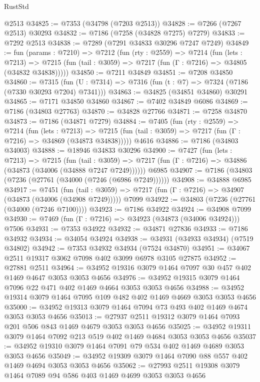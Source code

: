 \begin{lexlean}{RustStd}
\begin{coremodule}
    @2513
@34825 := @7353 (@34798 (@7203 @2513))
@34828 := @7266 (@7267 @2513) @30293
@34832 := @7186 (@7258 (@34828 @7275) @7279)
@34833 := @7292 @2513
@34838 := @7289 (@7291 @34833 @30296 @7247 @7249)
@34849 := fun (params : @7210) =>
  @7212
    (fun (rty : @2559) =>
    @7214
      (fun (lets : @7213) =>
      @7215 (fun (tail : @3059) => @7217 (fun (Γ : @7216) => @34805 (@34832 @34838)))))
@34850 := @7211 @34849
@34851 := @7208 @34850
@34860 := @7315
    (fun (U : @7314) => @7316 (fun (t : @7) => @7324 (@7186 (@7330 @30293 @7204) @7341)))
@34863 := @34825 (@34851 @34860) @30291
@34865 := @7171 @34850 @34860
@34867 := @7402 @34849 @6086
@34869 := @7186 (@34803 @27763)
@34870 := @34828 @27766
@34871 := @7258 @34870
@34873 := @7186 (@34871 @7279)
@34884 := @7405
    (fun (rty : @2559) =>
    @7214
      (fun (lets : @7213) =>
      @7215 (fun (tail : @3059) => @7217 (fun (Γ : @7216) => @34869 (@34873 @34838)))))
    @4616
@34886 := @7186 (@34803 @34003)
@34888 := @18946 @34833 @30296
@34900 := @7427
    (fun (lets : @7213) =>
    @7215
      (fun (tail : @3059) =>
      @7217 (fun (Γ : @7216) => @34886 (@34873 (@34006 (@34888 @7247 @7249))))))
    @6985
@34907 := @7186 (@34803 (@7236 (@27761 (@34000 (@7246 (@6986 @7249))))))
@34908 := @34888 @6985
@34917 := @7451
    (fun (tail : @3059) => @7217 (fun (Γ : @7216) => @34907 (@34873 (@34006 (@34908 @7249)))))
    @7099
@34922 := @34803 (@7236 (@27761 (@34000 (@7246 @7100))))
@34923 := @7186 @34922
@34924 := @34908 @7099
@34930 := @7469 (fun (Γ : @7216) => @34923 (@34873 (@34006 @34924))) @7506
@34931 := @7353 @34922
@34932 := @34871 @27836
@34933 := @7186 @34932
@34934 := @34054 @34924
@34938 := @34931 (@34933 @34934) (@7519 @34802)
@34942 := @7353 @34932 @34934 (@7524 @34870)
@34951 := @34067 @2511 @19317 @3062 @7098 @402 @3099 @6978 @3105 @27875
@34952 := @27881 @2511
@34964 := @34952 @19316 @3079 @1464 @7097 @30 @457 @402 @1469 @4647 @3053 @3053 @4656
@34976 := @34952 @19315 @3079 @1464 @7096 @22 @471 @402 @1469 @4664 @3053 @3053 @4656
@34988 := @34952 @19314 @3079 @1464 @7095 @109 @482 @402 @1469 @4669 @3053 @3053 @4656
@35000 := @34952 @19313 @3079 @1464 @7094 @73 @493 @402 @1469 @4674 @3053 @3053 @4656
@35013 := @27937 @2511 @19312 @3079 @1464 @7093 @201 @506 @843 @1469 @4679 @3053 @3053 @4656
@35025 := @34952 @19311 @3079 @1464 @7092 @213 @519 @402 @1469 @4684 @3053 @3053 @4656
@35037 := @34952 @19310 @3079 @1464 @7091 @79 @534 @402 @1469 @4689 @3053 @3053 @4656
@35049 := @34952 @19309 @3079 @1464 @7090 @88 @557 @402 @1469 @4694 @3053 @3053 @4656
@35062 := @27993 @2511 @19308 @3079 @1464 @7089 @94 @586 @403 @1469 @4699 @3053 @3053 @4656

\end{coremodule}
\end{lexlean}
